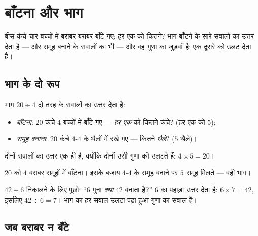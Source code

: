 \chapter{बाँटना और भाग}\label{ch:g3:division}

बीस कंचे चार बच्चों में बराबर-बराबर बाँटे गए: हर एक को कितने?
भाग बाँटने के सारे सवालों का उत्तर देता है --- और समूह बनाने के
सवालों का भी --- और वह गुणा का जुड़वाँ है: एक दूसरे को उलट
देता है।

\section{भाग के दो रूप}

\begin{definition}[भाग]\label{def:g3:division:def}
भाग $20 \div 4$ दो तरह के सवालों का उत्तर देता है:
\begin{itemize}
  \item \emph{बाँटना}: $20$ कंचे $4$ बच्चों में बाँटे गए ---
        \emph{हर एक} को कितने कंचे? (हर एक को $5$);
  \item \emph{समूह बनाना}: $20$ कंचे $4$-$4$ के थैलों में रखे
        गए --- कितने \emph{थैले}? ($5$ थैले)।
\end{itemize}
दोनों सवालों का उत्तर एक ही है, क्योंकि दोनों उसी गुणा को उलटते
हैं: $4 \times 5 = 20$।
\end{definition}

\begin{omfigure}

{\small $20$ को $4$ बराबर समूहों में बाँटना। इसके बजाय $4$-$4$ के
समूह बनाने पर $5$ समूह मिलते --- वही भाग।}
\end{omfigure}

\begin{method}[पहाड़ों से भाग]\label{met:g3:division:tables}
$42 \div 6$ निकालने के लिए पूछो: ``$6$ गुना \emph{क्या} $42$
बनाता है?'' $6$ का पहाड़ा उत्तर देता है: $6 \times 7 = 42$,
इसलिए $42 \div 6 = 7$। भाग का हर सवाल उलटा पढ़ा हुआ गुणा का
सवाल है।
\end{method}

\section{जब बराबर न बँटे}

